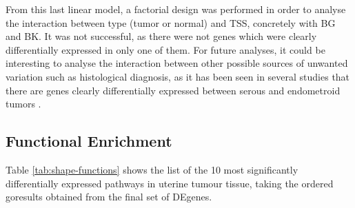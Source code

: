 \documentclass[9pt,twocolumn,twoside]{gsajnl}
\begin{document}
From this last linear model, a factorial design was performed in order to analyse the interaction between type (tumor or normal) and TSS, concretely with BG and BK. It was not successful, as there were not genes which were clearly differentially expressed in only one of them. For future analyses, it could be interesting to analyse the interaction between other possible sources of unwanted variation such as histological diagnosis, as it has been seen in several studies that there are genes clearly differentially expressed between serous and endometroid tumors \citep{Getz2013}.



\subsection*{Functional Enrichment}

Table \ref{tab:shape-functions} shows the list of the 10 most significantly differentially expressed pathways in uterine tumour tissue, taking the ordered goresults obtained from the final set of DEgenes. 
\end{document}
